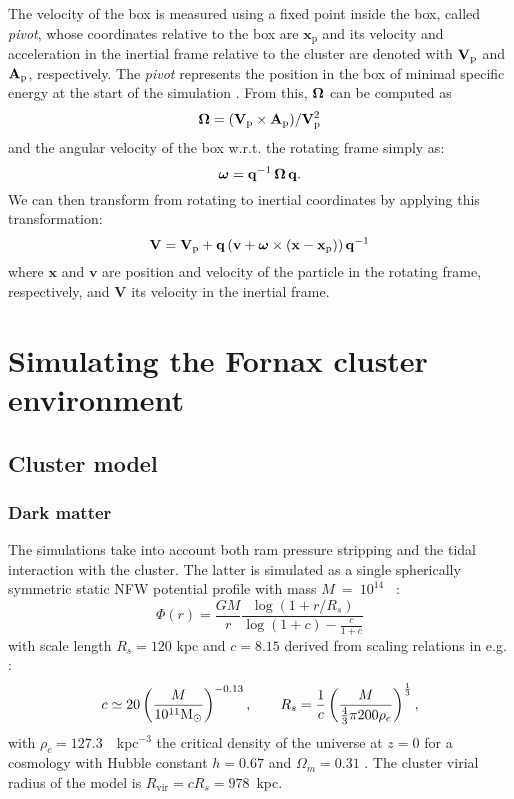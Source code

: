 The velocity of the box is measured using a fixed point inside the box, called \emph{pivot}, whose coordinates relative to the box are $\mathbf{x}_{\mathrm p}$ and its velocity and acceleration in the inertial frame relative to the cluster are denoted with $\mathbf{V}_{\mathrm p}$ and $\mathbf{A}_{\mathrm p}$, respectively.
The \emph{pivot} represents the position in the box of minimal specific energy at the start of the simulation \citep{Hausammann2019}.
From this, $\boldsymbol{\mathbf{\Omega}}$ can be computed as 
\begin{equation}
 \boldsymbol{\mathbf{\Omega}} = {(\mathbf{V}_{\mathrm p}\times\mathbf{A}_{\mathrm p})}/{\mathbf{V}_{\mathrm p}^2}
\end{equation}
and the angular velocity of the box w.r.t. the rotating frame simply as:
\begin{equation}
\boldsymbol{\mathbf{\omega}} = \mathbf q^{-1}\, \boldsymbol{\mathbf{\Omega}}\, \mathbf q.
\end{equation}
We can then transform from rotating to inertial coordinates by applying this transformation:
\begin{equation}
\boldsymbol{\mathbf{V}} = \mathbf{V}_{\mathrm p} + \mathbf q \left(\mathbf v + \boldsymbol{\mathbf{\omega}} \times (\mathbf x-\mathbf x_{\mathrm p})\right) \mathbf q^{-1}
\end{equation}
where $\mathbf x$ and $\mathbf v$ are position and velocity of the particle in the rotating frame, respectively, and $\mathbf V$ its velocity in the inertial frame. %


\section{Simulating the Fornax cluster environment}\label{sec:fornax_sim}

\subsection{Cluster model}

\subsubsection{Dark matter}
The simulations take into account both ram pressure stripping and the tidal interaction with the cluster.
The latter is simulated as a single spherically symmetric static NFW potential profile \citep{Navarro1996} with mass $M~=~10^{14}$~\Msun{} \citep{Drinkwater2001a}:
\begin{equation}
    \Phi(r) = \frac{G M}{r} \frac{\log(1+r/R_s)}{\log(1 + c) - \frac{c}{1+c}}
\end{equation}
with scale length $R_s = 120$ kpc and $c=8.15$ derived from scaling relations in e.g. \citet{Gentile2004, Wechsler2002}:
\begin{equation}
    c \simeq 20 \left(\frac{M}{10^{11} \text{\text{M}$_{\odot}${}} }\right)^{-0.13}, \qquad
    R_s = \frac 1 c \left(\frac{M}{\frac 4 3 \pi 200 \rho_c}\right)^\frac 1 3,
\end{equation}
with $\rho_c = 127.3$~\Msun{}~kpc$^{-3}$ the critical density of the universe at $z=0$ for a cosmology with Hubble constant $h=0.67$ and $\Omega_m = 0.31$ \citep{Planck2015}.
The cluster virial radius of the model is $R_{\mathrm{vir}} = c R_s = 978$~kpc.

